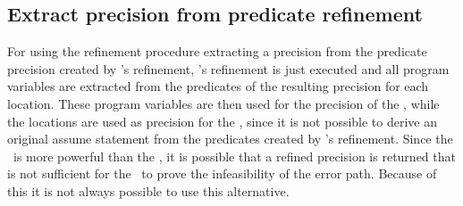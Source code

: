 
\subsection{Extract precision from predicate refinement}
For using the refinement procedure extracting a precision from the predicate precision created by \predicateCPA's refinement, \predicateCPA's refinement is just executed
and all program variables are extracted from the predicates of the resulting precision for each location.
These program variables are then used for the precision of the , while the locations are used as precision for the \constraintsCPA, since it is not possible to derive an original assume statement from the predicates created by \predicateCPA's refinement.
Since the \predicateCPA\ is more powerful than the \symbolicExecutionCPA, it is possible that a refined precision is returned that is not sufficient for the \symbolicExecutionCPA\ to prove the infeasibility of the error path.
Because of this it is not always possible to use this alternative.
